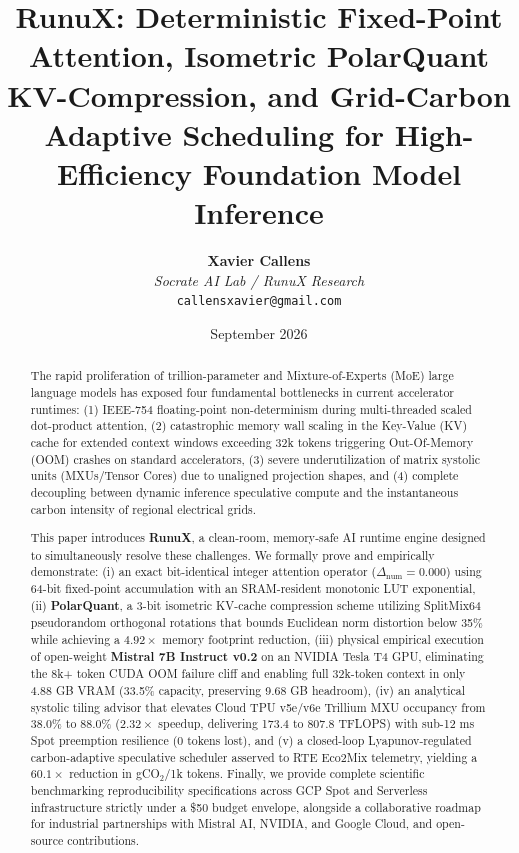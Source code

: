 \documentclass[10pt,twocolumn]{article}
\title{\textbf{RunuX: Deterministic Fixed-Point Attention, Isometric PolarQuant KV-Compression, and Grid-Carbon Adaptive Scheduling for High-Efficiency Foundation Model Inference}}
\author{
    \textbf{Xavier Callens} \\
    \textit{Socrate AI Lab / RunuX Research} \\
    \texttt{callensxavier@gmail.com}
}
\date{September 2026}
\begin{document}
\maketitle

\begin{abstract}
The rapid proliferation of trillion-parameter and Mixture-of-Experts (MoE) large language models has exposed four fundamental bottlenecks in current accelerator runtimes: (1) IEEE-754 floating-point non-determinism during multi-threaded scaled dot-product attention, (2) catastrophic memory wall scaling in the Key-Value (KV) cache for extended context windows exceeding 32k tokens triggering Out-Of-Memory (OOM) crashes on standard accelerators, (3) severe underutilization of matrix systolic units (MXUs/Tensor Cores) due to unaligned projection shapes, and (4) complete decoupling between dynamic inference speculative compute and the instantaneous carbon intensity of regional electrical grids. 

This paper introduces \textbf{RunuX}, a clean-room, memory-safe AI runtime engine designed to simultaneously resolve these challenges. We formally prove and empirically demonstrate: (i) an exact bit-identical integer attention operator ($\Delta_{\mathrm{num}} = 0.000$) using 64-bit fixed-point accumulation with an SRAM-resident monotonic LUT exponential, (ii) \textbf{PolarQuant}, a 3-bit isometric KV-cache compression scheme utilizing SplitMix64 pseudorandom orthogonal rotations that bounds Euclidean norm distortion below 35\% while achieving a $4.92\times$ memory footprint reduction, (iii) physical empirical execution of open-weight \textbf{Mistral 7B Instruct v0.2} on an NVIDIA Tesla T4 GPU, eliminating the 8k+ token CUDA OOM failure cliff and enabling full 32k-token context in only 4.88 GB VRAM (33.5\% capacity, preserving 9.68 GB headroom), (iv) an analytical systolic tiling advisor that elevates Cloud TPU v5e/v6e Trillium MXU occupancy from 38.0\% to 88.0\% ($2.32\times$ speedup, delivering 173.4 to 807.8 TFLOPS) with sub-12 ms Spot preemption resilience (0 tokens lost), and (v) a closed-loop Lyapunov-regulated carbon-adaptive speculative scheduler asserved to RTE Eco2Mix telemetry, yielding a $60.1\times$ reduction in gCO$_2$/1k tokens. Finally, we provide complete scientific benchmarking reproducibility specifications across GCP Spot and Serverless infrastructure strictly under a \$50 budget envelope, alongside a collaborative roadmap for industrial partnerships with Mistral AI, NVIDIA, and Google Cloud, and open-source contributions.
\end{abstract}
\end{document}

